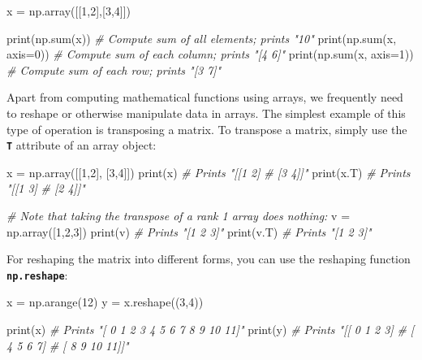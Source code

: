 \documentclass[
]{article}
\newenvironment{Shaded}{}{}
\newcommand{\BuiltInTok}[1]{#1}
\newcommand{\CommentTok}[1]{\textcolor[rgb]{0.38,0.63,0.69}{\textit{#1}}}
\newcommand{\DecValTok}[1]{\textcolor[rgb]{0.25,0.63,0.44}{#1}}
\newcommand{\NormalTok}[1]{#1}
\newcommand{\OperatorTok}[1]{\textcolor[rgb]{0.40,0.40,0.40}{#1}}
\begin{document}
\begin{Shaded}
\begin{Highlighting}[]
\NormalTok{x }\OperatorTok{=}\NormalTok{ np.array([[}\DecValTok{1}\NormalTok{,}\DecValTok{2}\NormalTok{],[}\DecValTok{3}\NormalTok{,}\DecValTok{4}\NormalTok{]])}

\BuiltInTok{print}\NormalTok{(np.}\BuiltInTok{sum}\NormalTok{(x))          }\CommentTok{\# Compute sum of all elements; prints "10"}
\BuiltInTok{print}\NormalTok{(np.}\BuiltInTok{sum}\NormalTok{(x, axis}\OperatorTok{=}\DecValTok{0}\NormalTok{))  }\CommentTok{\# Compute sum of each column; prints "[4 6]"}
\BuiltInTok{print}\NormalTok{(np.}\BuiltInTok{sum}\NormalTok{(x, axis}\OperatorTok{=}\DecValTok{1}\NormalTok{))  }\CommentTok{\# Compute sum of each row; prints "[3 7]"}
\end{Highlighting}
\end{Shaded}

Apart from computing mathematical functions using arrays, we frequently
need to reshape or otherwise manipulate data in arrays. The simplest
example of this type of operation is transposing a matrix. To transpose
a matrix, simply use the \textbf{\texttt{T}} attribute of an array
object:

\begin{Shaded}
\begin{Highlighting}[]
\NormalTok{x }\OperatorTok{=}\NormalTok{ np.array([[}\DecValTok{1}\NormalTok{,}\DecValTok{2}\NormalTok{], [}\DecValTok{3}\NormalTok{,}\DecValTok{4}\NormalTok{]])}
\BuiltInTok{print}\NormalTok{(x)    }\CommentTok{\# Prints "[[1 2]}
            \CommentTok{\#          [3 4]]"}
\BuiltInTok{print}\NormalTok{(x.T)  }\CommentTok{\# Prints "[[1 3]}
            \CommentTok{\#          [2 4]]"}

\CommentTok{\# Note that taking the transpose of a rank 1 array does nothing:}
\NormalTok{v }\OperatorTok{=}\NormalTok{ np.array([}\DecValTok{1}\NormalTok{,}\DecValTok{2}\NormalTok{,}\DecValTok{3}\NormalTok{])}
\BuiltInTok{print}\NormalTok{(v)    }\CommentTok{\# Prints "[1 2 3]"}
\BuiltInTok{print}\NormalTok{(v.T)  }\CommentTok{\# Prints "[1 2 3]"}
\end{Highlighting}
\end{Shaded}

For reshaping the matrix into different forms, you can use the reshaping
function \textbf{\texttt{np.reshape}}:

\begin{Shaded}
\begin{Highlighting}[]
\NormalTok{x }\OperatorTok{=}\NormalTok{ np.arange(}\DecValTok{12}\NormalTok{)}
\NormalTok{y }\OperatorTok{=}\NormalTok{ x.reshape((}\DecValTok{3}\NormalTok{,}\DecValTok{4}\NormalTok{))}

\BuiltInTok{print}\NormalTok{(x)    }\CommentTok{\# Prints "[ 0  1  2  3  4  5  6  7  8  9 10 11]"}
\BuiltInTok{print}\NormalTok{(y)    }\CommentTok{\# Prints "[[ 0  1  2  3]}
            \CommentTok{\#          [ 4  5  6  7]}
            \CommentTok{\#          [ 8  9 10 11]]"}
\end{Highlighting}
\end{Shaded}
\end{document}

